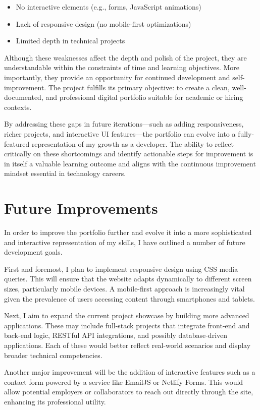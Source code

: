 \documentclass[11pt,a4paper]{article}
\begin{document}
\begin{itemize}
    \item No interactive elements (e.g., forms, JavaScript animations)
    \item Lack of responsive design (no mobile-first optimizations)
    \item Limited depth in technical projects
\end{itemize}

Although these weaknesses affect the depth and polish of the project, they are understandable within the constraints of time and learning objectives. More importantly, they provide an opportunity for continued development and self-improvement. The project fulfills its primary objective: to create a clean, well-documented, and professional digital portfolio suitable for academic or hiring contexts.

By addressing these gaps in future iterations—such as adding responsiveness, richer projects, and interactive UI features—the portfolio can evolve into a fully-featured representation of my growth as a developer. The ability to reflect critically on these shortcomings and identify actionable steps for improvement is in itself a valuable learning outcome and aligns with the continuous improvement mindset essential in technology careers.

\section*{Future Improvements}

In order to improve the portfolio further and evolve it into a more sophisticated and interactive representation of my skills, I have outlined a number of future development goals.

First and foremost, I plan to implement responsive design using CSS media queries. This will ensure that the website adapts dynamically to different screen sizes, particularly mobile devices. A mobile-first approach is increasingly vital given the prevalence of users accessing content through smartphones and tablets.

Next, I aim to expand the current project showcase by building more advanced applications. These may include full-stack projects that integrate front-end and back-end logic, RESTful API integrations, and possibly database-driven applications. Each of these would better reflect real-world scenarios and display broader technical competencies.

Another major improvement will be the addition of interactive features such as a contact form powered by a service like EmailJS or Netlify Forms. This would allow potential employers or collaborators to reach out directly through the site, enhancing its professional utility.
\end{document}
